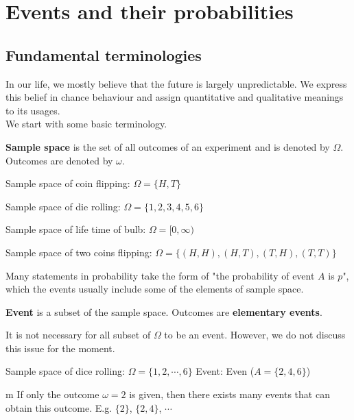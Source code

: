 \documentclass{huhtakm-template-book}
\begin{document}
\chapter{Events and their probabilities}
\section{Fundamental terminologies}
    In our life, we mostly believe that the future is largely unpredictable. We express this belief in chance behaviour and assign quantitative and qualitative meanings to its usages.\\
    We start with some basic terminology.
    \begin{defn} %
        \textbf{Sample space} is the set of all outcomes of an experiment and is denoted by $\Omega$. Outcomes are denoted by $\omega$.
    \end{defn}
    \begin{eg}
        Sample space of coin flipping: $\Omega=\{H,T\}$
    \end{eg}
    \begin{eg}
        Sample space of die rolling: $\Omega=\{1,2,3,4,5,6\}$
    \end{eg}
    \begin{eg}
        Sample space of life time of bulb: $\Omega=[0,\infty)$
    \end{eg}
    \begin{eg}
        Sample space of two coins flipping: $\Omega=\{(H,H),(H,T),(T,H),(T,T)\}$
    \end{eg}
    Many statements in probability take the form of "the probability of event $A$ is $p$", which the events usually include some of the elements of sample space.
    \begin{defn} %
        \textbf{Event} is a subset of the sample space. Outcomes are \textbf{elementary events}.
    \end{defn}
    \begin{rem}
        It is not necessary for all subset of $\Omega$ to be an event. However, we do not discuss this issue for the moment.
    \end{rem}
    \begin{eg}
        Sample space of dice rolling: $\Omega=\{1,2,\cdots,6\}$ \quad Event: Even ($A=\{2,4,6\}$)
    \end{eg}
    \begin{rem}m
        If only the outcome $\omega=2$ is given, then there exists many events that can obtain this outcome. E.g. $\{2\}$, $\{2,4\}$, $\cdots$
    \end{rem}
\end{document}
